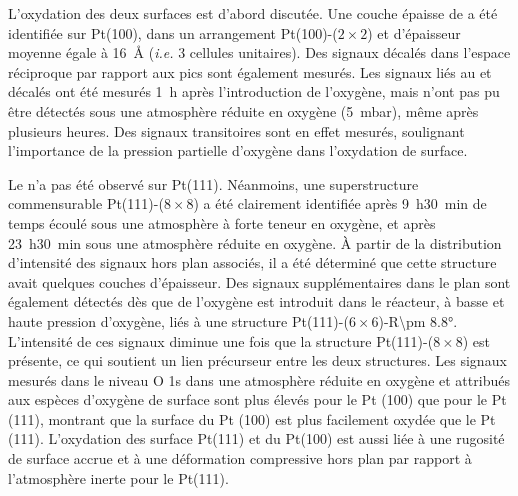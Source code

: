 L'oxydation des deux surfaces est d'abord discutée.
Une couche épaisse de  a été identifiée sur Pt(100), dans un arrangement Pt(100)-($2\times2$) et d'épaisseur moyenne égale à \qty{16}{\angstrom} (\textit{i.e.} 3 cellules unitaires).
Des signaux décalés dans l'espace réciproque par rapport aux pics  sont également mesurés.
Les signaux liés au  et décalés ont été mesurés \qty{1}{\hour} après l'introduction de l'oxygène, mais n'ont pas pu être détectés sous une atmosphère réduite en oxygène (\qty{5}{\milli\bar}), même après plusieurs heures.
Des signaux transitoires sont en effet mesurés, soulignant l’importance de la pression partielle d’oxygène dans l’oxydation de surface.

Le  n'a pas été observé sur Pt(111).
Néanmoins, une superstructure commensurable Pt(111)-($8\times8$) a été clairement identifiée après \qty{9}{\hour}\qty{30}{\minute} de temps écoulé sous une atmosphère à forte teneur en oxygène, et après \qty {23}{\hour}\qty{30}{\minute} sous une atmosphère réduite en oxygène.
À partir de la distribution d’intensité des signaux hors plan associés, il a été déterminé que cette structure avait quelques couches d’épaisseur.
Des signaux supplémentaires dans le plan sont également détectés dès que de l'oxygène est introduit dans le réacteur, à basse et haute pression d'oxygène, liés à une structure Pt(111)-($6\times6$)-R\ang{\pm 8.8}.
L'intensité de ces signaux diminue une fois que la structure Pt(111)-($8\times8$) est présente, ce qui soutient un lien précurseur entre les deux structures.
Les signaux mesurés dans le niveau O 1s dans une atmosphère réduite en oxygène et attribués aux espèces d'oxygène de surface sont plus élevés pour le Pt (100) que pour le Pt (111), montrant que la surface du Pt (100) est plus facilement oxydée que le Pt (111).
L'oxydation des surface Pt(111) et du Pt(100) est aussi liée à une rugosité de surface accrue et à une déformation compressive hors plan par rapport à l'atmosphère inerte pour le Pt(111).


